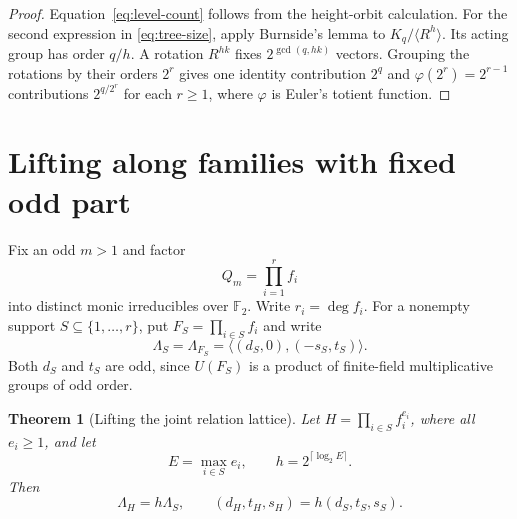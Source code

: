 \documentclass[11pt]{article}
\newtheorem{theorem}{Theorem}[section]
\theoremstyle{definition}
\theoremstyle{remark}
\numberwithin{equation}{section}
\newcommand{\F}{\mathbb F_2}
\begin{document}
\begin{proof}
Equation~\eqref{eq:level-count} follows from the height-orbit calculation.
For the second expression in \eqref{eq:tree-size}, apply Burnside's lemma
to $K_q/\langle R^h\rangle$. Its acting group has order $q/h$. A rotation
$R^{hk}$ fixes $2^{\gcd(q,hk)}$ vectors. Grouping the rotations by their
orders $2^r$ gives one identity contribution $2^q$ and
$\varphi(2^r)=2^{r-1}$ contributions $2^{q/2^r}$ for each $r\ge1$,
where $\varphi$ is Euler's totient function.
\end{proof}

\section{Lifting along families with fixed odd part}\label{sec:lifting}

Fix an odd $m>1$ and factor
\begin{equation}\label{eq:squarefree-factors}
 Q_m=\prod_{i=1}^r f_i
\end{equation}
into distinct monic irreducibles over $\F$. Write $r_i=\deg f_i$.
For a nonempty support $S\subseteq\{1,\ldots,r\}$, put
$F_S=\prod_{i\in S}f_i$ and write
\[
 \Lambda_S=\Lambda_{F_S}
 =\langle(d_S,0),(-s_S,t_S)\rangle.
\]
Both $d_S$ and $t_S$ are odd, since $U(F_S)$ is a product of
finite-field multiplicative groups of odd order.

\begin{theorem}[Lifting the joint relation lattice]\label{thm:lift}
Let $H=\prod_{i\in S}f_i^{e_i}$, where all $e_i\ge1$, and let
\begin{equation}\label{eq:lift-level}
 E=\max_{i\in S}e_i,\qquad h=2^{\lceil\log_2 E\rceil}.
\end{equation}
Then
\begin{equation}\label{eq:lift}
 \Lambda_H=h\Lambda_S,
 \qquad (d_H,t_H,s_H)=h(d_S,t_S,s_S).
\end{equation}
\end{theorem}
\end{document}
